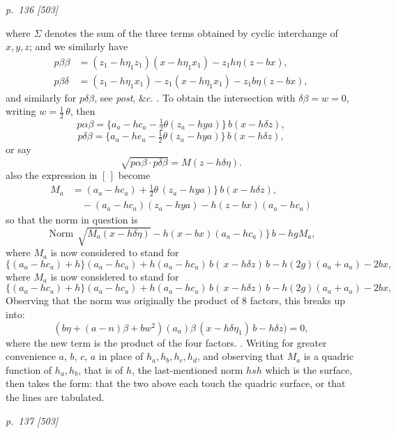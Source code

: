 \documentclass[11pt,a4paper]{book}
\begin{document}
\clearpage

\bigskip
\textit{p.~136 [503]}
\smallskip

\noindent
where $\Sigma$ denotes the sum of the three terms obtained by cyclic interchange of
$x, y, z$; and we similarly have
\begin{align*}
p\beta\beta &= (z_1 - h\eta_1 z_1) (x - h\eta_1 x_1) - z_1 h\eta(z - bx),\\
p\beta\delta &= (z_1 - h\eta_1 x_1) - z_1 (x - h\eta_1 x_1) - z_1 b\eta(z - bx),
\end{align*}
and similarly for $p\delta\beta$, see \textit{post}, $\&c.$
. To obtain the intersection with $\delta\beta = w = 0$, writing $w = \frac{1}{2}\,\theta$, then
\[
p\alpha\beta = \{a_a - h c_a - \tfrac{1}{2}\theta (z_a - h y a)\}\,b (x - h\delta z),
\]
\[
p\delta\beta = \{a_a - h e_a - \tfrac{1}{2}\theta (z_a - h y a)\}\,b (x - h\delta z),
\]
or say
\[
\sqrt{p\alpha\beta\cdot p\delta\beta} = M(z - h\delta\eta).
\]
also the expression in $[ \, ]$ become
\begin{align*}
M_a &= (a_a - h c_a) + \tfrac{1}{2}\theta\,(z_a - h y a)\}\,b (x - h\delta z),\\
& \quad - (a_a - h c_a)(z_a - h y a) - h (z - bx)(a_a - h c_a)
\end{align*}
so that the norm in question is
\[
\operatorname{Norm}\, \sqrt{M_a (x - h\delta\eta)} - h (x - bx)(a_a - h c_a)\}\,b - hg M_a,
\]
where $M_a$ is now considered to stand for
\[
\{(a_a - h c_a) + h\}(a_a - h c_a) + h(a_a - h c_a)\,b(\,x - h\delta z)\,b - h(2g)(a_a + a_a) - 2bx,
\]
where $M_a$ is now considered to stand for
\[
\{(a_a - h c_a) + h\}(a_a - h c_a) + h(a_a - h c_a)\,b(\,x - h\delta z)\,b - h(2g)(a_a + a_a) - 2bx,
\]
Observing that the norm was originally the product of 8 factors, this breaks up into:
\[
(b\eta + (a - n)\beta + bw^2)(a_a)\beta\,(x - h\delta\eta_1)\,b - h\delta z) = 0,
\]
where the new term is the product of the four factors.
. Writing for greater convenience $a$, $b$, $c$, $a$ in place of $h_a, h_b, h_c, h_d$, and observing
that $M_a$ is a quadric function of $h_a, h_b$, that is of $h$, the last-mentioned norm $hsh$
which is the surface, then takes the form: that the two above each touch the quadric surface,
or that the lines are tabulated.

\clearpage

\bigskip
\textit{p.~137 [503]}
\smallskip
\end{document}
